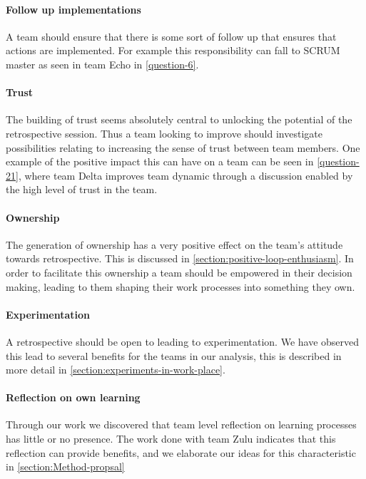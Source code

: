 \paragraph{Follow up implementations}
A team should ensure that there is some sort of follow up that ensures that actions are implemented. For example this responsibility can fall to SCRUM master as seen in team Echo in \autoref{question-6}.

\paragraph{Trust}
The building of trust seems absolutely central to unlocking the potential of the retrospective session. Thus a team looking to improve should investigate possibilities relating to increasing the sense of trust between team members. One example of the positive impact this can have on a team can be seen in \autoref{question-21}, where team Delta improves team dynamic through a discussion enabled by the high level of trust in the team.

\paragraph{Ownership}
The generation of ownership has a very positive effect on the team's attitude towards retrospective. This is discussed in \autoref{section:positive-loop-enthusiasm}. In order to facilitate this ownership a team should be empowered in their decision making, leading to them shaping their work processes into something they own.

\paragraph{Experimentation}
A retrospective should be open to leading to experimentation. We have observed this lead to several benefits for the teams in our analysis, this is described in more detail in \autoref{section:experiments-in-work-place}. 

\paragraph{Reflection on own learning}
Through our work we discovered that team level reflection on learning processes has little or no presence. The work done with team Zulu indicates that this reflection can provide benefits, and we elaborate our ideas for this characteristic in \autoref{section:Method-propsal}


